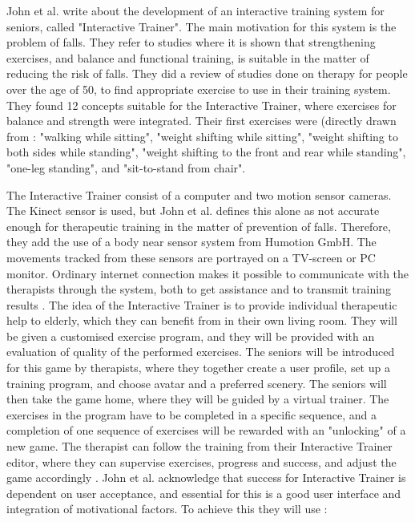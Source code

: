 John et al. \cite{john2012smartsenior} write about the development of an interactive training system for seniors, called "Interactive Trainer". The main motivation for this system is the problem of falls. They refer to studies where it is shown that strengthening exercises, and balance and functional training, is suitable in the matter of reducing the risk of falls. They did a review of studies done on therapy for people over the age of 50, to find appropriate exercise to use in their training system. They found 12 concepts suitable for the Interactive Trainer, where exercises for balance and strength were integrated. Their first exercises were (directly drawn from \cite{john2012smartsenior}: "walking while sitting", "weight shifting while sitting", "weight shifting to both sides while standing", "weight shifting to the front and rear while standing", "one-leg standing", and "sit-to-stand from chair".
      
The Interactive Trainer consist of a computer and two motion sensor cameras. The Kinect sensor is used, but John et al. defines this alone as not accurate enough for therapeutic training in the matter of prevention of falls. Therefore, they add the use of a body near sensor system from Humotion GmbH. The movements tracked from these sensors are portrayed on a TV-screen or PC monitor. Ordinary internet connection makes it possible to communicate with the therapists through the system, both to get assistance and to transmit training results \cite{john2012smartsenior}. The idea of the Interactive Trainer is to provide individual therapeutic help to elderly, which they can benefit from in their own living room. They will be given a customised exercise program, and they will be provided with an evaluation of quality of the performed exercises. The seniors will be introduced for this game by therapists, where they together create a user profile, set up a training program, and choose avatar and a preferred scenery. The seniors will then take the game home, where they will be guided by a virtual trainer. The exercises in the program have to be completed in a specific sequence, and a completion of one sequence of exercises will be rewarded with an "unlocking" of a new game. The therapist can follow the training from their Interactive Trainer editor, where they can supervise exercises, progress and success, and adjust the game accordingly \cite{john2012smartsenior}. John et al. acknowledge that success for Interactive Trainer is dependent on user acceptance, and essential for this is a good user interface and integration of motivational factors. To achieve this they will use \cite{john2012smartsenior}:

